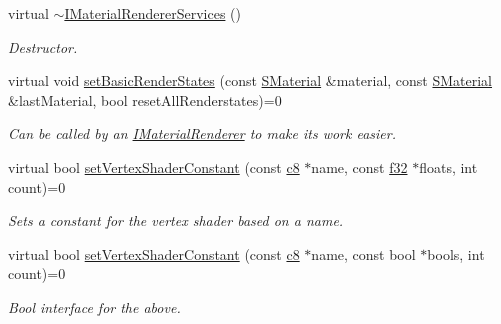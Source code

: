 \begin{DoxyCompactItemize}
\item 
\mbox{\label{classirr_1_1video_1_1IMaterialRendererServices_abbab02366d5303f106d14278bf88aff3}} 
virtual \hyperlink{classirr_1_1video_1_1IMaterialRendererServices_abbab02366d5303f106d14278bf88aff3}{$\sim$\+I\+Material\+Renderer\+Services} ()
\begin{DoxyCompactList}\small\item\em Destructor. \end{DoxyCompactList}\item 
virtual void \hyperlink{classirr_1_1video_1_1IMaterialRendererServices_ab000e24fe3f65fb63b007a37895df3f2}{set\+Basic\+Render\+States} (const \hyperlink{classirr_1_1video_1_1SMaterial}{S\+Material} \&material, const \hyperlink{classirr_1_1video_1_1SMaterial}{S\+Material} \&last\+Material, bool reset\+All\+Renderstates)=0
\begin{DoxyCompactList}\small\item\em Can be called by an \hyperlink{classirr_1_1video_1_1IMaterialRenderer}{I\+Material\+Renderer} to make its work easier. \end{DoxyCompactList}\item 
virtual bool \hyperlink{classirr_1_1video_1_1IMaterialRendererServices_a294db14b4f3608d29d0e457246df3d16}{set\+Vertex\+Shader\+Constant} (const \hyperlink{namespaceirr_a9395eaea339bcb546b319e9c96bf7410}{c8} $\ast$name, const \hyperlink{namespaceirr_a0277be98d67dc26ff93b1a6a1d086b07}{f32} $\ast$floats, int count)=0
\begin{DoxyCompactList}\small\item\em Sets a constant for the vertex shader based on a name. \end{DoxyCompactList}\item 
\mbox{\label{classirr_1_1video_1_1IMaterialRendererServices_aed8c3f830451ec416265202d2dc90f92}} 
virtual bool \hyperlink{classirr_1_1video_1_1IMaterialRendererServices_aed8c3f830451ec416265202d2dc90f92}{set\+Vertex\+Shader\+Constant} (const \hyperlink{namespaceirr_a9395eaea339bcb546b319e9c96bf7410}{c8} $\ast$name, const bool $\ast$bools, int count)=0
\begin{DoxyCompactList}\small\item\em Bool interface for the above. \end{DoxyCompactList}\item 

\end{DoxyCompactItemize}
